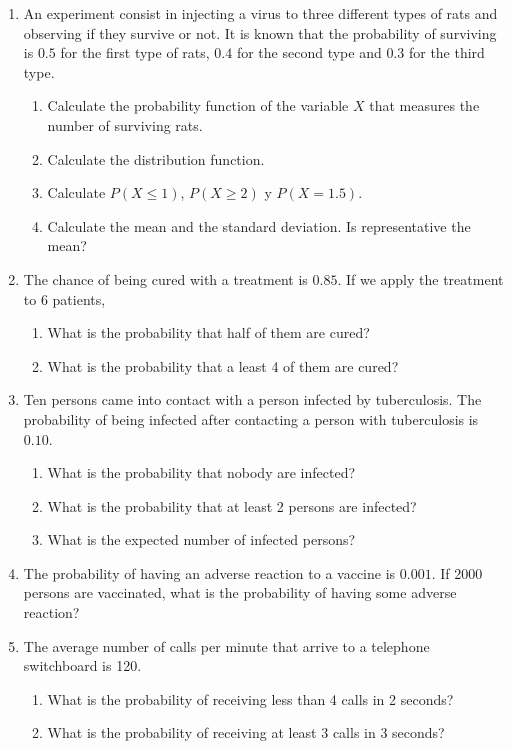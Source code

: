 \begin{enumerate}[leftmargin=*,resume]
\item An experiment consist in injecting a virus to three different types of rats and observing if they survive or not. 
It is known that the probability of surviving is $0.5$ for the first type of rats, $0.4$ for the second type and $0.3$
for the third type.
\begin{enumerate}
\item Calculate the probability function of the variable $X$ that measures the number of surviving rats.
\item Calculate the distribution function.
\item Calculate $P(X\leq 1)$, $P(X\geq 2)$ y $P(X=1.5)$.
\item Calculate the mean and the standard deviation. 
Is representative the mean?
\end{enumerate}

\item The chance of being cured with a treatment is $0.85$. 
If we apply the treatment to 6 patients,
\begin{enumerate}
\item What is the probability that half of them are cured?
\item What is the probability that a least 4 of them are cured?
\end{enumerate}

\item Ten persons came into contact with a person infected by tuberculosis. 
The probability of being infected after contacting a person with tuberculosis is $0.10$.
\begin{enumerate}
\item What is the probability that nobody are infected?
\item What is the probability that at least 2 persons are infected?
\item What is the expected number of infected persons? 
\end{enumerate}

\item The probability of having an adverse reaction to a vaccine is $0.001$. 
If 2000 persons are vaccinated, what is the probability of having some adverse reaction?

\item The average number of calls per minute that arrive to a telephone switchboard is 120. 
\begin{enumerate}
\item What is the probability of receiving less than 4 calls in 2 seconds?
\item What is the probability of receiving at least 3 calls in 3 seconds?
\end{enumerate}


\end{enumerate}
